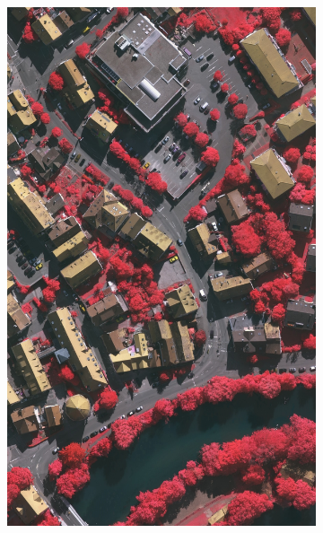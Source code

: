 \begin{figure}[htb]
\begin{subfigure}{0.19\textwidth}
  \centering
  \includegraphics[width=1\linewidth]{fig/vai/26_irg.JPG}
\end{subfigure}\vspace{1mm}
\begin{subfigure}{0.19\textwidth}
  \centering

\end{subfigure}
\end{figure}
